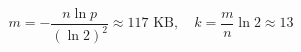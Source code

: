 \documentclass[preview,varwidth=88mm]{standalone}
\begin{document}
\begin{equation*}
m = -\frac{n \ln p}{(\ln 2)^2} \approx 117 \text{ KB}, \quad k = \frac{m}{n} \ln 2 \approx 13
\end{equation*}
\end{document}
